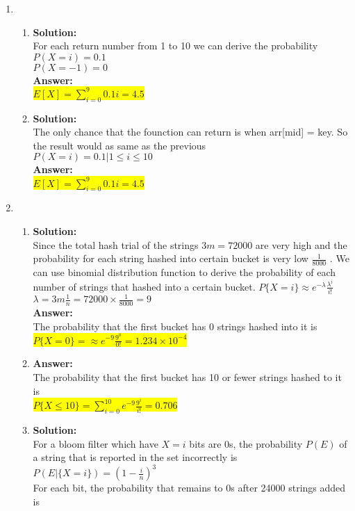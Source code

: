 \documentclass{article}
\newcommand{\myansw}{\textbf{Answer:}\\}
\newcommand{\mysolu}{\textbf{Solution:}\\}
\begin{document}
\begin{enumerate}
	\item
	\begin{enumerate}
		\item
		\mysolu
		For each return number from 1 to 10 we can derive the probability\\
		$P(X=i) = 0.1$\\
		$P(X = -1) = 0$\\
		\myansw
		\colorbox{yellow}{$E[X] = \sum\limits_{i=0}^{9}0.1i =4.5$}\\
		\item
		\mysolu
		The only chance that the founction can return is when arr[mid] = key. So the result would as same as the previous\\
		$P(X=i) = 0.1 | 1\leq i \leq 10$\\
		\myansw
		\colorbox{yellow}{$E[X] = \sum\limits_{i=0}^{9}0.1i =4.5$}\\
	\end{enumerate}
	\item 
	\begin{enumerate}
		\item
		\mysolu
		Since the total hash trial of the strings ${3m = 72000}$ are very high and the probability for each string hashed into certain bucket is very low ${\frac{1}{8000}}$ . We can use binomial distribution function to derive the probability of each number of strings that hashed into a certain bucket.
		$P\{X=i\} \approx e^{- \lambda}\frac{\lambda^i}{i!}$\\
		${\lambda = 3m \frac{1}{n} = 72000 \times 
		\frac{1}{8000} = 9}$\\
		\myansw
		The probability that the first bucket has 0 strings hashed into it is\\
		\colorbox{yellow}{
			${P\{X = 0\} =\approx e^{-9}\frac{9^0}{0!}=1.234\times 10^{-4}}$
		}\\
		\item
		\myansw
		The probability that the first bucket has 10 or fewer strings hashed to it is\\
		\colorbox{yellow}{
			${P\{X \leq 10\} = \sum\limits_{i=0}^{10} e^{-9}\frac{9^i}{i!}=0.706}$
		}
		\item
		\mysolu
		For a bloom filter which have ${X = i}$ bits are 0s, the probability ${P(E)}$ of a string that is reported in the set incorrectly is\\
		${P(E|\{X = i\})= (1-\frac{i}{n})^3}$\\
		For each bit, the probability that remains to 0s after 24000 strings added is\\

\end{enumerate}
\end{enumerate}
\end{document}
